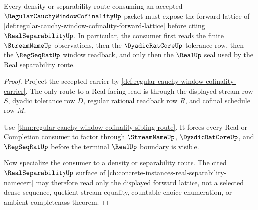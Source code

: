 \begin{theorem}
\label{thm:regular-cauchy-window-cofinality-forward-lattice}
Every density or separability route consuming an accepted $\RegularCauchyWindowCofinalityUp$ packet must expose the forward lattice of \autoref{def:regular-cauchy-window-cofinality-forward-lattice} before citing $\RealSeparabilityUp$. In particular, the consumer first reads the finite $\StreamNameUp$ observations, then the $\DyadicRatCoreUp$ tolerance row, then the $\RegSeqRatUp$ window readback, and only then the $\RealUp$ seal used by the Real separability route.
\end{theorem}
\begin{proof}
Project the accepted carrier by \autoref{def:regular-cauchy-window-cofinality-carrier}. The only route to a Real-facing read is through the displayed stream row $S$, dyadic tolerance row $D$, regular rational readback row $R$, and cofinal schedule row $M$.

Use \autoref{thm:regular-cauchy-window-cofinality-sibling-route}. It forces every Real or Completion consumer to factor through $\StreamNameUp$, $\DyadicRatCoreUp$, and $\RegSeqRatUp$ before the terminal $\RealUp$ boundary is visible.

Now specialize the consumer to a density or separability route. The cited $\RealSeparabilityUp$ surface of \autoref{ch:concrete-instances-real-separability-namecert} may therefore read only the displayed forward lattice, not a selected dense sequence, quotient stream equality, countable-choice enumeration, or ambient completeness theorem.
\end{proof}





